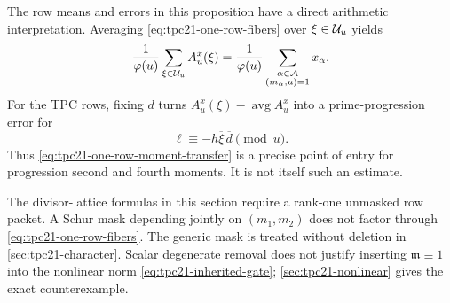 The row means and errors in this proposition have a direct arithmetic
interpretation.  Averaging \eqref{eq:tpc21-one-row-fibers} over
\(\xi\in\mathcal U_u\) yields
\begin{equation}
 \frac1{\varphi(u)}\sum_{\xi\in\mathcal U_u}A_u^x(\xi)
 =\frac1{\varphi(u)}
  \sum_{\substack{\alpha\in\mathcal A\\(m_\alpha,u)=1}}x_\alpha.
 \label{eq:tpc21-Au-exact-mean}
\end{equation}
For the TPC rows, fixing \(d\) turns
\(A_u^x(\xi)-\operatorname{avg}A_u^x\) into a prime-progression error
for
\begin{equation}
 \ell\equiv-h\overline\xi\,\overline d\pmod u.
 \label{eq:tpc21-row-prime-progression}
\end{equation}
Thus \eqref{eq:tpc21-one-row-moment-transfer} is a precise point of
entry for progression second and fourth moments.  It is not itself such
an estimate.

\begin{remark}
\label{rem:tpc21-divisor-mask-boundary}
The divisor-lattice formulas in this section require a rank-one
unmasked row packet.  A Schur mask depending jointly on \((m_1,m_2)\)
does not factor through \eqref{eq:tpc21-one-row-fibers}.  The generic
mask is treated without deletion in \cref{sec:tpc21-character}.
Scalar degenerate removal does not justify inserting
\(\mathfrak m\equiv1\) into the nonlinear norm
\eqref{eq:tpc21-inherited-gate}; \cref{sec:tpc21-nonlinear} gives the
exact counterexample.
\end{remark}
